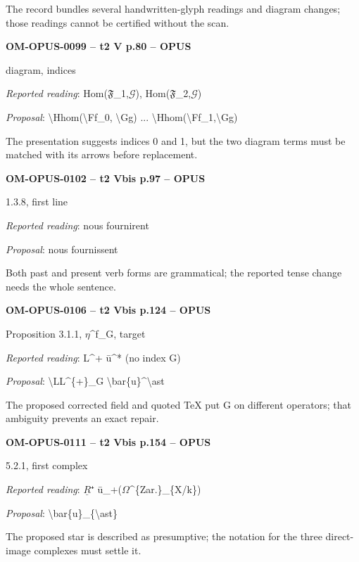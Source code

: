 The record bundles several handwritten-glyph readings and diagram changes; those readings cannot be certified without the scan.\par
\par\noindent\textbf{OM-OPUS-0099 -- t2 V p.80 -- OPUS}\par
diagram, indices\par
\emph{Reported reading}: Hom(\ensuremath{𝔉}\_1,\ensuremath{𝒢}), Hom(\ensuremath{𝔉}\_2,\ensuremath{𝒢})\par
\emph{Proposal}: \textbackslash{}Hhom(\textbackslash{}Ff\_0, \textbackslash{}Gg) ... \textbackslash{}Hhom(\textbackslash{}Ff\_1,\textbackslash{}Gg)\par
The presentation suggests indices 0 and 1, but the two diagram terms must be matched with its arrows before replacement.\par
\par\noindent\textbf{OM-OPUS-0102 -- t2 Vbis p.97 -- OPUS}\par
1.3.8, first line\par
\emph{Reported reading}: nous fournirent\par
\emph{Proposal}: nous fournissent\par
Both past and present verb forms are grammatical; the reported tense change needs the whole sentence.\par
\par\noindent\textbf{OM-OPUS-0106 -- t2 Vbis p.124 -- OPUS}\par
Proposition 3.1.1, \ensuremath{\eta}\textasciicircum{}f\_G, target\par
\emph{Reported reading}: L\textasciicircum{}+ ū\textasciicircum{}* (no index G)\par
\emph{Proposal}: \textbackslash{}LL\textasciicircum{}\{+\}\_G \textbackslash{}bar\{u\}\textasciicircum{}\textbackslash{}ast\par
The proposed corrected field and quoted TeX put G on different operators; that ambiguity prevents an exact repair.\par
\par\noindent\textbf{OM-OPUS-0111 -- t2 Vbis p.154 -- OPUS}\par
5.2.1, first complex\par
\emph{Reported reading}: \ensuremath{\underline{R}}⁺ ū\_+(\ensuremath{\Omega}\textasciicircum{}\{Zar.\}\_\{X/k\})\par
\emph{Proposal}: \textbackslash{}bar\{u\}\_\{\textbackslash{}ast\}\par
The proposed star is described as presumptive; the notation for the three direct-image complexes must settle it.\par
